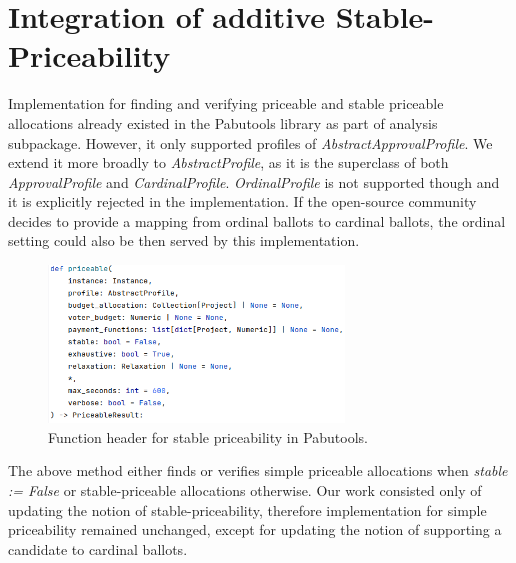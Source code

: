 \section{Integration of additive Stable-Priceability}
Implementation for finding and verifying priceable and stable priceable allocations already existed in the Pabutools library as part of analysis subpackage. However, it only supported profiles of \emph{AbstractApprovalProfile}. We extend it more broadly to \emph{AbstractProfile}, as it is the superclass of both \emph{ApprovalProfile} and \emph{CardinalProfile}. \emph{OrdinalProfile} is not supported though and it is explicitly rejected in the implementation. If the open-source community decides to provide a mapping from ordinal ballots to cardinal ballots, the ordinal setting could also be then served by this implementation.
\begin{figure}[H]         
  \centering              
  \includegraphics[width=0.7\textwidth]{figures/Priceable_function_header.png}
  \caption{Function header for stable priceability in Pabutools.}
  \label{fig:myplot}
\end{figure}
The above method either finds or verifies simple priceable allocations when \emph{stable := False} or stable-priceable allocations otherwise. Our work consisted only of updating the notion of stable-priceability, therefore implementation for simple priceability remained unchanged, except for updating the notion of supporting a candidate to cardinal ballots.

